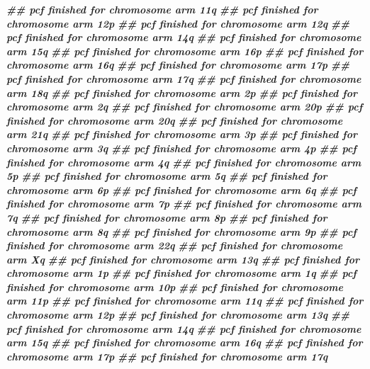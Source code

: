 \documentclass[
  12pt,
  a4paper,
  twoside]{book}
\newenvironment{Shaded}{\begin{snugshade}}{\end{snugshade}}
\newcommand{\DocumentationTok}[1]{\textcolor[rgb]{0.56,0.35,0.01}{\textbf{\textit{#1}}}}
\begin{document}
\begin{Shaded}
\begin{Highlighting}[]
\DocumentationTok{\#\# pcf finished for chromosome arm 11q }
\DocumentationTok{\#\# pcf finished for chromosome arm 12p }
\DocumentationTok{\#\# pcf finished for chromosome arm 12q }
\DocumentationTok{\#\# pcf finished for chromosome arm 14q }
\DocumentationTok{\#\# pcf finished for chromosome arm 15q }
\DocumentationTok{\#\# pcf finished for chromosome arm 16p }
\DocumentationTok{\#\# pcf finished for chromosome arm 16q }
\DocumentationTok{\#\# pcf finished for chromosome arm 17p }
\DocumentationTok{\#\# pcf finished for chromosome arm 17q }
\DocumentationTok{\#\# pcf finished for chromosome arm 18q }
\DocumentationTok{\#\# pcf finished for chromosome arm 2p }
\DocumentationTok{\#\# pcf finished for chromosome arm 2q }
\DocumentationTok{\#\# pcf finished for chromosome arm 20p }
\DocumentationTok{\#\# pcf finished for chromosome arm 20q }
\DocumentationTok{\#\# pcf finished for chromosome arm 21q }
\DocumentationTok{\#\# pcf finished for chromosome arm 3p }
\DocumentationTok{\#\# pcf finished for chromosome arm 3q }
\DocumentationTok{\#\# pcf finished for chromosome arm 4p }
\DocumentationTok{\#\# pcf finished for chromosome arm 4q }
\DocumentationTok{\#\# pcf finished for chromosome arm 5p }
\DocumentationTok{\#\# pcf finished for chromosome arm 5q }
\DocumentationTok{\#\# pcf finished for chromosome arm 6p }
\DocumentationTok{\#\# pcf finished for chromosome arm 6q }
\DocumentationTok{\#\# pcf finished for chromosome arm 7p }
\DocumentationTok{\#\# pcf finished for chromosome arm 7q }
\DocumentationTok{\#\# pcf finished for chromosome arm 8p }
\DocumentationTok{\#\# pcf finished for chromosome arm 8q }
\DocumentationTok{\#\# pcf finished for chromosome arm 9p }
\DocumentationTok{\#\# pcf finished for chromosome arm 22q }
\DocumentationTok{\#\# pcf finished for chromosome arm Xq }
\DocumentationTok{\#\# pcf finished for chromosome arm 13q }
\DocumentationTok{\#\# pcf finished for chromosome arm 1p }
\DocumentationTok{\#\# pcf finished for chromosome arm 1q }
\DocumentationTok{\#\# pcf finished for chromosome arm 10p }
\DocumentationTok{\#\# pcf finished for chromosome arm 11p }
\DocumentationTok{\#\# pcf finished for chromosome arm 11q }
\DocumentationTok{\#\# pcf finished for chromosome arm 12p }
\DocumentationTok{\#\# pcf finished for chromosome arm 13q }
\DocumentationTok{\#\# pcf finished for chromosome arm 14q }
\DocumentationTok{\#\# pcf finished for chromosome arm 15q }
\DocumentationTok{\#\# pcf finished for chromosome arm 16q }
\DocumentationTok{\#\# pcf finished for chromosome arm 17p }
\DocumentationTok{\#\# pcf finished for chromosome arm 17q }

\end{Highlighting}
\end{Shaded}
\end{document}
